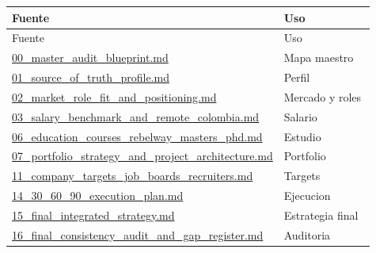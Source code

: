 \begin{center}
\scriptsize
\begin{longtable}{>{\raggedright\arraybackslash}p{0.455\linewidth} >{\raggedright\arraybackslash}p{0.455\linewidth}}
\toprule
Fuente & Uso \\
\midrule
\endfirsthead
\toprule
Fuente & Uso \\
\midrule
\endhead
\href{file:///E:/Laboral/00_master_audit_blueprint.md}{00\_master\_audit\_blueprint.md} & Mapa maestro \\
\href{file:///E:/Laboral/01_source_of_truth_profile.md}{01\_source\_of\_truth\_profile.md} & Perfil \\
\href{file:///E:/Laboral/02_market_role_fit_and_positioning.md}{02\_market\_role\_fit\_and\_positioning.md} & Mercado y roles \\
\href{file:///E:/Laboral/03_salary_benchmark_and_remote_colombia.md}{03\_salary\_benchmark\_and\_remote\_colombia.md} & Salario \\
\href{file:///E:/Laboral/06_education_courses_rebelway_masters_phd.md}{06\_education\_courses\_rebelway\_masters\_phd.md} & Estudio \\
\href{file:///E:/Laboral/07_portfolio_strategy_and_project_architecture.md}{07\_portfolio\_strategy\_and\_project\_architecture.md} & Portfolio \\
\href{file:///E:/Laboral/11_company_targets_job_boards_recruiters.md}{11\_company\_targets\_job\_boards\_recruiters.md} & Targets \\
\href{file:///E:/Laboral/14_30_60_90_execution_plan.md}{14\_30\_60\_90\_execution\_plan.md} & Ejecucion \\
\href{file:///E:/Laboral/15_final_integrated_strategy.md}{15\_final\_integrated\_strategy.md} & Estrategia final \\
\href{file:///E:/Laboral/16_final_consistency_audit_and_gap_register.md}{16\_final\_consistency\_audit\_and\_gap\_register.md} & Auditoria \\
\bottomrule
\end{longtable}
\end{center}
